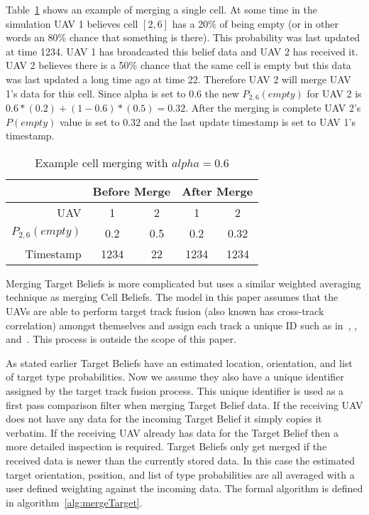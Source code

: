 \begin{multicols*}{2}
Table~\ref{tab:exampleCellMerge} shows an example of merging a single cell.  At some time in the simulation UAV 1 believes cell $[2, 6]$ has a 20\% of being empty (or in other words an 80\% chance that something is there). This probability was last updated at time 1234.  UAV 1 has broadcasted this belief data and UAV 2 has received it.  UAV 2 believes there is a 50\% chance that the same cell is empty but this data was last updated a long time ago at time 22.  Therefore UAV 2 will merge UAV 1's data for this cell.  Since alpha is set to 0.6 the new $P_{2,6}(empty)$ for UAV 2 is $0.6*(0.2) + (1-0.6)*(0.5)=0.32$.  After the merging is complete UAV 2's $P(empty)$ value is set to $0.32$ and the last update timestamp is set to UAV 1's timestamp.

\begin{table}[H]
	\caption{Example cell merging with $alpha=0.6$}
	\centering
	\label{tab:exampleCellMerge}
	\begin{tabular}{|r|c|c||c|c|}
		\hline
		                & \multicolumn{2}{c||}{Before Merge} & \multicolumn{2}{c|}{After Merge} \\
		\hline
		UAV             & 1   & 2                            & 1   & 2 \\
		\hline
		$P_{2,6}(empty)$& 0.2 & 0.5                          & 0.2 & 0.32 \\
		\hline
		Timestamp       & 1234& 22                           & 1234& 1234 \\
		\hline
	\end{tabular}
\end{table}

Merging Target Beliefs is more complicated but uses a similar weighted averaging technique as merging Cell Beliefs.  The model in this paper assumes that the UAVs are able to perform target track fusion (also known has cross-track correlation) amongst themselves and assign each track a unique ID such as in~\cite{stroupe}, \cite{barooah}, and~\cite{spillings}.  This process is outside the scope of this paper.

As stated earlier Target Beliefs have an estimated location, orientation, and list of target type probabilities.  Now we assume they also have a unique identifier assigned by the target track fusion process.  This unique identifier is used as a first pass comparison filter when merging Target Belief data.  If the receiving UAV does not have any data for the incoming Target Belief it simply copies it verbatim.  If the receiving UAV already has data for the Target Belief then a more detailed inspection is required.  Target Beliefs only get merged if the received data is newer than the currently stored data.  In this case the estimated target orientation, position, and list of type probabilities are all averaged with a user defined weighting against the incoming data.  The formal algorithm is defined in algorithm~\ref{alg:mergeTarget}.


\end{multicols*}
